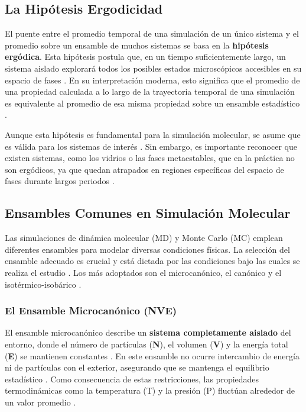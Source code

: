 \subsection{La Hipótesis Ergodicidad}

El puente entre el promedio temporal de una simulación de un único sistema y el promedio sobre un ensamble de muchos sistemas se basa en la \textbf{hipótesis ergódica}. Esta hipótesis postula que, en un tiempo suficientemente largo, un sistema aislado explorará todos los posibles estados microscópicos accesibles en su espacio de fases \cite[98]{zhou2022molecular}. En su interpretación moderna, esto significa que el promedio de una propiedad calculada a lo largo de la trayectoria temporal de una simulación es equivalente al promedio de esa misma propiedad sobre un ensamble estadístico \cite[68]{haile1992molecular}.

Aunque esta hipótesis es fundamental para la simulación molecular, se asume que es válida para los sistemas de interés \cite[63]{frenkel2002understanding}. Sin embargo, es importante reconocer que existen sistemas, como los vidrios o las fases metaestables, que en la práctica no son ergódicos, ya que quedan atrapados en regiones específicas del espacio de fases durante largos periodos \cite[63]{frenkel2002understanding}.

\subsection{Ensambles Comunes en Simulación Molecular}

Las simulaciones de dinámica molecular (MD) y Monte Carlo (MC) emplean diferentes ensambles para modelar diversas condiciones físicas. La selección del ensamble adecuado es crucial y está dictada por las condiciones bajo las cuales se realiza el estudio \cite[99]{zhou2022molecular}. Los más adoptados son el microcanónico, el canónico y el isotérmico-isobárico \cite[98]{zhou2022molecular}.

\subsubsection{El Ensamble Microcanónico (NVE)}

El ensamble microcanónico describe un \textbf{sistema completamente aislado} del entorno, donde el número de partículas (\textbf{N}), el volumen (\textbf{V}) y la energía total (\textbf{E}) se mantienen constantes \cite[98]{zhou2022molecular}. En este ensamble no ocurre intercambio de energía ni de partículas con el exterior, asegurando que se mantenga el equilibrio estadístico \cite[98]{zhou2022molecular}. Como consecuencia de estas restricciones, las propiedades termodinámicas como la temperatura (T) y la presión (P) fluctúan alrededor de un valor promedio \cite[98]{zhou2022molecular}.


